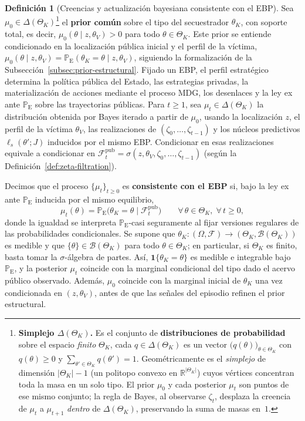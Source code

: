 \documentclass[12pt]{article}
\theoremstyle{definition}
\newtheorem{definition}[theorem]{Definición}
\theoremstyle{remark}
\newcommand{\ProbE}{\mathbb{P}_{\mathrm{E}}}
\newcommand{\1}{\mathbf{1}}
\begin{document}
\begin{definition}[Creencias y actualización bayesiana consistente con el EBP]
\label{def:beliefs-martingale}
Sea $\mu_0\in\Delta(\Theta_K)$\footnote{%
\textbf{Simplejo $\Delta(\Theta_K)$.} Es el conjunto de \textbf{distribuciones de probabilidad} sobre el espacio \emph{finito} $\Theta_K$, cada $q\in\Delta(\Theta_K)$ es un vector $\bigl(q(\theta)\bigr)_{\theta\in\Theta_K}$ con $q(\theta)\ge 0$ y $\sum_{\theta'\in\Theta_K} q(\theta')=1$. Geométricamente es el \emph{simplejo} de dimensión $\lvert\Theta_K\rvert-1$ \textup{(}un politopo convexo en $\mathbb{R}^{\lvert\Theta_K\rvert}$\textup{)} cuyos vértices concentran toda la masa en un solo tipo. El prior $\mu_0$ y cada posterior $\mu_t$ son puntos de ese mismo conjunto; la regla de Bayes, al observarse $\zeta_t$, desplaza la creencia de $\mu_t$ a $\mu_{t+1}$ \emph{dentro} de $\Delta(\Theta_K)$, preservando la suma de masas en~$1$.%
} el \textbf{prior común} sobre el tipo del secuestrador $\theta_K$, con soporte total, es decir, $\mu_0(\theta \mid z, \theta_V)>0$ para todo $\theta \in \Theta_K$. Este prior se entiende condicionado en la localización pública inicial y el perfil de la víctima, $\mu_0(\theta \mid z, \theta_V)=\ProbE(\theta_K=\theta \mid z, \theta_V)$, siguiendo la formalización de la Subsección~\ref{subsec:prior-estructural}. Fijado un EBP, el perfil estratégico determina la política pública del Estado, las estrategias privadas, la materialización de acciones mediante el proceso MDG, los desenlaces y la ley ex ante $\ProbE$ sobre las trayectorias públicas. Para $t\ge 1$, sea $\mu_t\in\Delta(\Theta_K)$ la distribución obtenida por Bayes iterado a partir de $\mu_0$, usando la localización $z$, el perfil de la víctima $\theta_V$, las realizaciones de $(\zeta_0,\ldots,\zeta_{t-1})$ y los núcleos predictivos $\ell_s(\theta';J)$ inducidos por el mismo EBP. Condicionar en esas realizaciones equivale a condicionar en $\mathcal{F}_t^{\mathrm{pub}}=\sigma(z,\theta_V,\zeta_0,\ldots,\zeta_{t-1})$ \textup{(}según la Definición~\ref{def:zeta-filtration}\textup{)}.

Decimos que el proceso $\{\mu_t\}_{t\ge 0}$ es \textbf{consistente con el EBP} si, bajo la ley ex ante $\ProbE$ inducida por el mismo equilibrio,
\begin{equation}
\label{eq:beliefs-ebp-consistency}
\mu_t(\theta)=\ProbE\bigl(\theta_K=\theta\mid\mathcal{F}_t^{\mathrm{pub}}\bigr)\qquad \forall\,\theta\in\Theta_K,\;\forall\,t\ge 0,
\end{equation}
donde la igualdad se interpreta $\ProbE$-casi seguramente al fijar versiones regulares de las probabilidades condicionales. Se supone que $\theta_K:(\Omega,\mathcal{F})\to(\Theta_K,\mathcal{B}(\Theta_K))$ es medible y que $\{\theta\}\in\mathcal{B}(\Theta_K)$ para todo $\theta\in\Theta_K$; en particular, si $\Theta_K$ es finito, basta tomar la $\sigma$-álgebra de partes. Así, $\mathbf{1}\{\theta_K=\theta\}$ es medible e integrable bajo $\ProbE$, y la posterior $\mu_t$ coincide con la marginal condicional del tipo dado el acervo público observado. Además, $\mu_0$ coincide con la marginal inicial de $\theta_K$ una vez condicionada en $(z, \theta_V)$, antes de que las señales del episodio refinen el prior estructural.
\end{definition}
\end{document}
